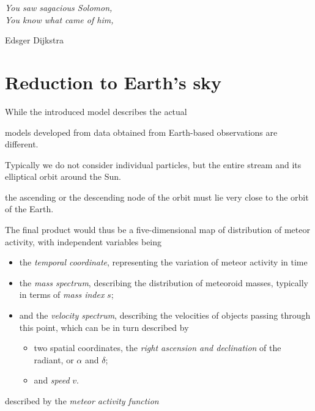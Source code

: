 \epigraph{\it
    You saw sagacious Solomon,\\
    You know what came of him,
}{\vspace{2mm}Edsger Dijkstra}


\section{Reduction to Earth's sky} \label{ir}
    While the introduced model describes the actual 

    models developed from data obtained from Earth-based observations are different.

    Typically we do not consider individual particles, but the entire stream and its elliptical orbit around the Sun.

    the ascending or the descending node of the orbit must lie very close to the orbit of the Earth.




    The final product would thus be a five-dimensional map of distribution of meteor activity, with independent variables being
    \begin{itemize}
        \item the \emph{temporal coordinate}, representing the variation of meteor activity in time    \item the \emph{mass spectrum}, describing the distribution of meteoroid masses, typically in terms of \textit{mass index} $s$;
        \item and the \emph{velocity spectrum}, describing the velocities of objects passing through this point, which can be in turn described by
            \begin{itemize}
                \item two spatial coordinates, the \emph{right ascension and declination} of the radiant, or $\alpha$ and $\delta$;
                \item and \emph{speed} $v$.
            \end{itemize}
    \end{itemize}

    described by the \emph{meteor activity function}

    \citep{balaz+2020}

